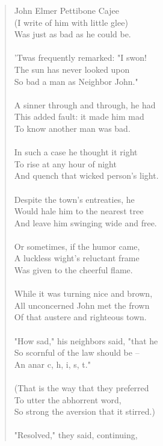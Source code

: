 \documentclass[11pt]{article}
\begin{document}
\begin{quote}   John Elmer Pettibone Cajee \\
  (I write of him with little glee) \\
  Was just as bad as he could be. \\
 \\
  'Twas frequently remarked:  "I swon! \\
  The sun has never looked upon \\
  So bad a man as Neighbor John." \\
 \\
  A sinner through and through, he had \\
  This added fault:  it made him mad \\
  To know another man was bad. \\
 \\
  In such a case he thought it right \\
  To rise at any hour of night \\
  And quench that wicked person's light. \\
 \\
  Despite the town's entreaties, he \\
  Would hale him to the nearest tree \\
  And leave him swinging wide and free. \\
 \\
  Or sometimes, if the humor came, \\
  A luckless wight's reluctant frame \\
  Was given to the cheerful flame. \\
 \\
  While it was turning nice and brown, \\
  All unconcerned John met the frown \\
  Of that austere and righteous town. \\
 \\
  "How sad," his neighbors said, "that he \\
  So scornful of the law should be -- \\
  An anar c, h, i, s, t." \\
 \\
  (That is the way that they preferred \\
  To utter the abhorrent word, \\
  So strong the aversion that it stirred.) \\
 \\
  "Resolved," they said, continuing, \\

\end{quote}
\end{document}
